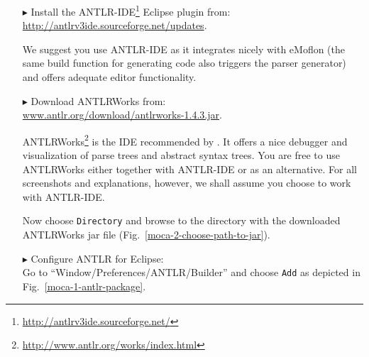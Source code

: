 \begin{enumerate}
\item[$\blacktriangleright$] Install the ANTLR-IDE\footnote{\url{http://antlrv3ide.sourceforge.net/}} Eclipse plugin from:\\ \url{http://antlrv3ide.sourceforge.net/updates}.

We suggest you use ANTLR-IDE as it integrates nicely with eMoflon (the same build function for generating code also triggers the parser generator) and offers adequate editor functionality.

\item[$\blacktriangleright$] Download ANTLRWorks from:\\ \url{www.antlr.org/download/antlrworks-1.4.3.jar}.

ANTLRWorks\footnote{\url{http://www.antlr.org/works/index.html}} is the IDE recommended by \cite{ANTLR}.  
It offers a nice debugger and visualization of parse trees and abstract syntax trees.
You are free to use ANTLRWorks either together with ANTLR-IDE or as an alternative.
For all screenshots and explanations, however, we shall assume you choose to work with ANTLR-IDE.  

Now choose \texttt{Directory} and browse to the directory with the downloaded ANTLRWorks jar file (Fig.~\ref{moca-2-choose-path-to-jar}).

\item[$\blacktriangleright$] Configure ANTLR for Eclipse:\\ Go to ``Window/Preferences/ANTLR/Builder'' and choose \texttt{Add} as depicted in Fig.~\ref{moca-1-antlr-package}.


\end{enumerate}
